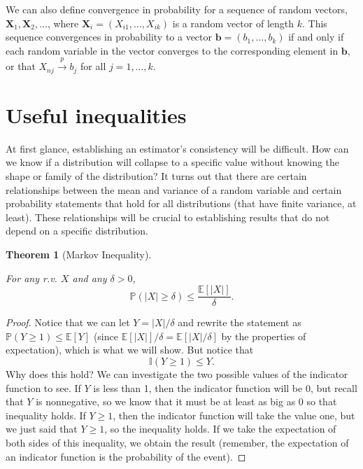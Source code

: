 \documentclass[
  letterpaper,
  DIV=11,
  numbers=noendperiod]{scrreprt}
\newcommand{\mb}{\symbf}
\newcommand{\E}{\mathbb{E}}
\renewcommand{\P}{\mathbb{P}}
\newcommand{\X}{\mb{X}}
\newcommand{\inprob}{\overset{p}{\to}}
\theoremstyle{definition}
\theoremstyle{definition}
\theoremstyle{plain}
\newtheorem{theorem}{Theorem}[chapter]
\theoremstyle{remark}
\begin{document}
We can also define convergence in probability for a sequence of random
vectors, \(\X_1, \X_2, \ldots\), where
\(\X_i = (X_{i1}, \ldots, X_{ik})\) is a random vector of length \(k\).
This sequence convergences in probability to a vector
\(\mb{b} = (b_1, \ldots, b_k)\) if and only if each random variable in
the vector converges to the corresponding element in \(\mb{b}\), or that
\(X_{nj} \inprob b_j\) for all \(j = 1, \ldots, k\).

\hypertarget{useful-inequalities}{%
\section{Useful inequalities}\label{useful-inequalities}}

At first glance, establishing an estimator's consistency will be
difficult. How can we know if a distribution will collapse to a specific
value without knowing the shape or family of the distribution? It turns
out that there are certain relationships between the mean and variance
of a random variable and certain probability statements that hold for
all distributions (that have finite variance, at least). These
relationships will be crucial to establishing results that do not depend
on a specific distribution.

\begin{theorem}[Markov
Inequality]\protect\hypertarget{thm-markov}{}\label{thm-markov}

For any r.v. \(X\) and any \(\delta >0\), \[
\P(|X| \geq \delta) \leq \frac{\E[|X|]}{\delta}.
\]

\end{theorem}

\begin{proof}

Notice that we can let \(Y = |X|/\delta\) and rewrite the statement as
\(\P(Y \geq 1) \leq \E[Y]\) (since \(\E[|X|]/\delta = \E[|X|/\delta]\)
by the properties of expectation), which is what we will show. But
notice that \[
\mathbb{I}(Y \geq 1) \leq Y.
\] Why does this hold? We can investigate the two possible values of the
indicator function to see. If \(Y\) is less than 1, then the indicator
function will be 0, but recall that \(Y\) is nonnegative, so we know
that it must be at least as big as 0 so that inequality holds. If
\(Y \geq 1\), then the indicator function will take the value one, but
we just said that \(Y \geq 1\), so the inequality holds. If we take the
expectation of both sides of this inequality, we obtain the result
(remember, the expectation of an indicator function is the probability
of the event).

\end{proof}
\end{document}
